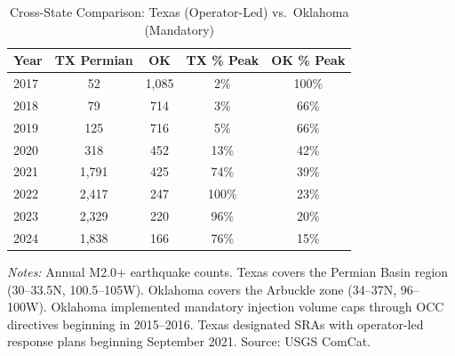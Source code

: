 \begin{table}[htbp]
\centering
\caption{Cross-State Comparison: Texas (Operator-Led) vs.~Oklahoma (Mandatory)}
\label{tab:comparison}
\begin{threeparttable}
\begin{tabular}{lcccc}
\toprule
Year & TX Permian & OK & TX \% Peak & OK \% Peak \\
\midrule
2017 & 52 & 1,085 & 2\% & 100\% \\
2018 & 79 & 714 & 3\% & 66\% \\
2019 & 125 & 716 & 5\% & 66\% \\
2020 & 318 & 452 & 13\% & 42\% \\
2021 & 1,791 & 425 & 74\% & 39\% \\
2022 & 2,417 & 247 & 100\% & 23\% \\
2023 & 2,329 & 220 & 96\% & 20\% \\
2024 & 1,838 & 166 & 76\% & 15\% \\
\bottomrule
\end{tabular}
\begin{tablenotes}[flushleft]\small
\item \textit{Notes:} Annual M2.0+ earthquake counts. Texas covers the Permian Basin region (30--33.5\textdegree{}N, 100.5--105\textdegree{}W). Oklahoma covers the Arbuckle zone (34--37\textdegree{}N, 96--100\textdegree{}W). Oklahoma implemented mandatory injection volume caps through OCC directives beginning in 2015--2016. Texas designated SRAs with operator-led response plans beginning September 2021. Source: USGS ComCat.
\end{tablenotes}
\end{threeparttable}
\end{table}
